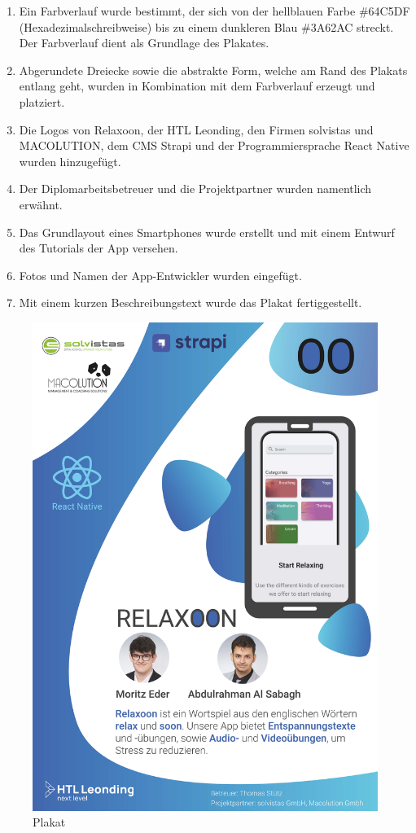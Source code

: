 \begin{enumerate}
    \item Ein Farbverlauf wurde bestimmt, der sich von der hellblauen Farbe \#64C5DF (Hexadezimalschreibweise)
          bis zu einem dunkleren Blau \#3A62AC streckt. Der Farbverlauf dient als Grundlage des Plakates.
    \item Abgerundete Dreiecke sowie die abstrakte Form, welche am Rand des Plakats entlang geht,
          wurden in Kombination mit dem Farbverlauf erzeugt und platziert.
    \item Die Logos von Relaxoon, der HTL Leonding, den Firmen solvistas und MACOLUTION, dem CMS Strapi und der Programmiersprache React Native wurden hinzugefügt.
    \item Der Diplomarbeitsbetreuer und die Projektpartner wurden namentlich erwähnt.
    \item Das Grundlayout eines Smartphones wurde erstellt und mit einem Entwurf des Tutorials der App versehen.
    \item Fotos und Namen der App-Entwickler wurden eingefügt.
    \item Mit einem kurzen Beschreibungstext wurde das Plakat fertiggestellt.
\end{enumerate}


\begin{figure}[H]
    \centering
    \includegraphics[height=1.4\textwidth]{./pics/Relaxoon-Plakat.jpg}
    \caption{Plakat}
\end{figure}




